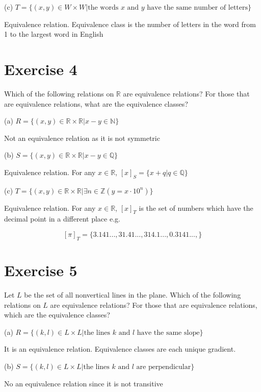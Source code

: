 \documentclass[11pt]{article}
\begin{document}
\noindent (c) $T = \{(x,y) \in W \times W | \text{the words } x \text{ and } y \text{ have the same number of letters} \}$

Equivalence relation. Equivalence class is the number of letters in the word from 
1 to the largest word in English 

\section*{Exercise 4}

Which of the following relations on $\mathbb{R}$ are equivalence relations?
For those that are equivalence relations, what are the equivalence classes?

\noindent (a) $R = \{(x,y) \in \mathbb{R} \times \mathbb{R} | x - y \in \mathbb{N}\}$

Not an equivalence relation as it is not symmetric

\noindent (b) $S = \{(x,y) \in \mathbb{R} \times \mathbb{R} | x-y \in \mathbb{Q}\}$

Equivalence relation. For any $x \in \mathbb{R}$, $[x]_S = \{x + q | q \in \mathbb{Q} \}$

\noindent (c) $T = \{(x,y) \in \mathbb{R} \times \mathbb{R} | \exists n \in \mathbb{Z} (y = x \cdot 10^n)\}$

Equivalence relation. For any $x \in \mathbb{R}$, $[x]_T$ is the set of numbers 
which have the decimal point in a different place e.g.

$$[\pi]_T = \{3.141..., 31.41..., 314.1..., 0.3141...,\}$$

\section*{Exercise 5}

Let $L$ be the set of all nonvertical lines in the plane. Which of the following
relations on $L$ are equivalence relations? For those that are equivalence relations,
which are the equivalence classes?

\noindent (a) $R = \{(k,l) \in L \times L | \text{the lines } k \text{ and } l \text{ have the same slope}\}$

It is an equivalence relation. Equivalence classes are each unique gradient.

\noindent (b) $S = \{(k,l) \in L \times L | \text{the lines } k \text{ and } l \text{ are perpendicular}\}$

No an equivalence relation since it is not transitive
\end{document}
